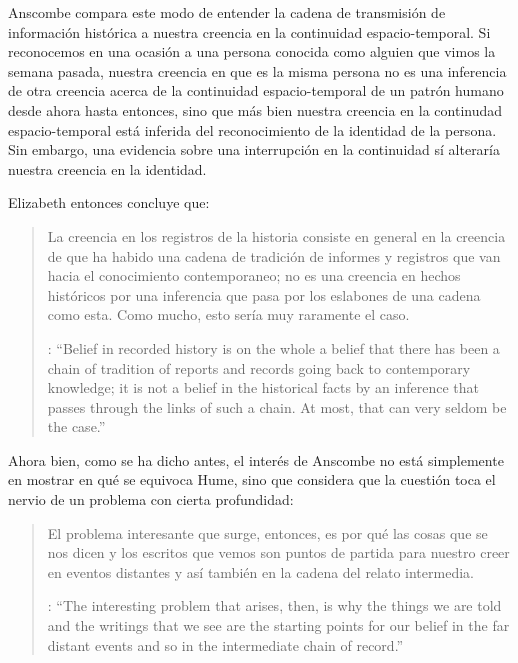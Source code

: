 Anscombe compara este modo de entender la cadena de transmisión de información histórica a nuestra creencia en la continuidad espacio-temporal. Si reconocemos en una ocasión a una persona conocida como alguien que vimos la semana pasada, nuestra creencia en que es la misma persona no es una inferencia de otra creencia acerca de la continuidad espacio-temporal de un patrón humano desde ahora hasta entonces, sino que más bien nuestra creencia en la continudad espacio-temporal está inferida del reconocimiento de la identidad de la persona. Sin embargo, una evidencia sobre una interrupción en la continuidad sí alteraría nuestra creencia en la identidad.

Elizabeth entonces concluye que: \blockquote[{\cite[89]{anscombe1981parmenides:humeandjulius}}: \enquote{Belief in recorded history is on the whole a belief that there has been a chain of tradition of reports and records going back to contemporary knowledge; it is not a belief in the historical facts by an inference that passes through the links of such a chain. At most, that can very seldom be the case.}]{La creencia en los registros de la historia consiste en general en la creencia de que ha habido una cadena de tradición de informes y registros que van hacia el conocimiento contemporaneo; no es una creencia en hechos históricos por una inferencia que pasa por los eslabones de una cadena como esta. Como mucho, esto sería muy raramente el caso.}

Ahora bien, como se ha dicho antes, el interés de Anscombe no está simplemente en mostrar en qué se equivoca Hume, sino que considera que la cuestión toca el nervio de un problema con cierta profundidad: \blockquote[{\cite[122]{anscombe2011plato:humecaus}}: \enquote{The interesting problem that arises, then, is why the things we are told and the writings that we see are the starting points for our belief in the far distant events and so in the intermediate chain of record.}]{El problema interesante que surge, entonces, es por qué las cosas que se nos dicen y los escritos que vemos son puntos de partida para nuestro creer en eventos distantes y así también en la cadena del relato intermedia.}

